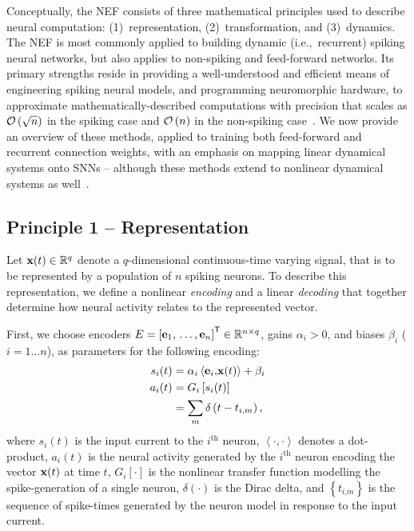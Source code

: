 Conceptually, the NEF consists of three mathematical principles used to describe neural computation: (1)~representation, (2)~transformation, and (3)~dynamics.
The NEF is most commonly applied to building dynamic (i.e.,~recurrent) spiking neural networks, but also applies to non-spiking and feed-forward networks.
Its primary strengths reside in providing a well-understood and efficient means of engineering spiking neural models, and programming neuromorphic hardware, to approximate mathematically-described computations with precision that scales as $\mathcal{O}\left({\sqrt{n}}\right)$ in the spiking case and $\mathcal{O}\left({n}\right)$ in the non-spiking case~\citep{eliasmith2003a, boahen2017neuromorph}.
We now provide an overview of these methods, applied to training both feed-forward and recurrent connection weights, with an emphasis on mapping linear dynamical systems onto SNNs -- although these methods extend to nonlinear dynamical systems as well~\citep{voelker2017iscas, voelker2017neuromorphic}.

\subsection{Principle 1 -- Representation}
\label{sec:principle1}

Let $\mathbf{x}(t) \in \mathbb{R}^q$ denote a $q$-dimensional continuous-time varying signal, that is to be represented by a population of $n$ spiking neurons.
To describe this representation, we define a nonlinear \emph{encoding} and a linear \emph{decoding} that together determine how neural activity relates to the represented vector.

First, we choose encoders $E = {\left[ \mathbf{e}_1\text{,}\, \ldots\text{,}\, \mathbf{e}_n \right]}^\mathsf{T} \in \mathbb{R}^{n \times q}$, gains $\alpha_i > 0$, and biases $\beta_i$ ($i = 1 \ldots n$), as parameters for the following encoding:
\begin{equation}
\begin{aligned} \label{eq:encoding}
s_i(t) &= \alpha_i \left\langle \mathbf{e}_i\text{,} \mathbf{x}(t) \right\rangle + \beta_i \\
a_i(t) &= G_i \left[ s_i(t) \right] \\
&= \sum_m \delta \left(t - t_{i\text{,}m} \right) \text{,}
\end{aligned}
\end{equation}
where $s_i(t)$ is the input current to the $i^\text{th}$ neuron, $\left\langle \cdot , \cdot \right\rangle$ denotes a dot-product,
$a_i(t)$ is the neural activity generated by the $i^{\text{th}}$ neuron encoding the vector $\mathbf{x}(t)$ at time $t$, $G_i \left[ \cdot \right]$ is the nonlinear transfer function modelling the spike-generation of a single neuron,
$\delta(\cdot)$ is the Dirac delta, and $\left\{ t_{i\text{,}m} \right\}$ is the sequence of spike-times generated by the neuron model in response to the input current.

